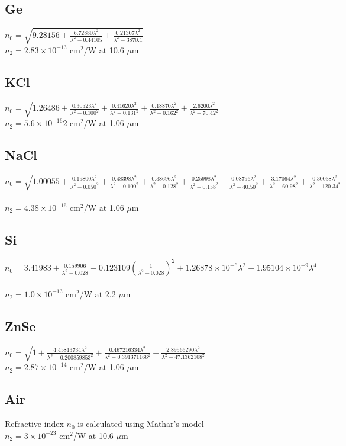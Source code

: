 \documentclass{report}
\begin{document}
\begin{appendices}
\subsection*{Ge}
$n_0=\sqrt{9.28156+\frac{6.72880\lambda^2}{\lambda^2-0.44105}+\frac{0.21307\lambda^2}{\lambda^2-3870.1}}$ \cite{Barnes-1979}\\
$n_2 = 2.83\times 10^{-13}$ cm$^2$/W at 10.6 $\mu$m \cite{Sheik-Bahae-1991}
\subsection*{KCl}
$n_0=\sqrt{1.26486+\frac{0.30523\lambda^2}{\lambda^2-0.100^2}+\frac{0.41620\lambda^2}{\lambda^2-0.131^2}+\frac{0.18870\lambda^2}{\lambda^2-0.162^2}+\frac{2.6200\lambda^2}{\lambda^2-70.42^2}}$ \cite{Li-1976}\\
$n_2 = 5.6 \times 10^{-16}2$ cm$^2$/W at 1.06 $\mu$m \cite{Sheik-Bahae-1991}
\subsection*{NaCl}
$n_0=\sqrt{1.00055+\frac{0.19800\lambda^2}{\lambda^2-0.050^2}+\frac{0.48398\lambda^2}{\lambda^2-0.100^2}+\frac{0.38696\lambda^2}{\lambda^2-0.128^2}+\frac{0.25998\lambda^2}{\lambda^2-0.158^2}+\frac{0.08796\lambda^2}{\lambda^2-40.50^2}+\frac{3.17064\lambda^2}{\lambda^2-60.98^2}+\frac{0.30038\lambda^2}{\lambda^2-120.34^2}}$ \cite{Li-1976}\\
$n_2 = 4.38\times 10^{-16}$ cm$^2$/W at 1.06 $\mu$m \cite{Sheik-Bahae-1991}
\subsection*{Si}
$n_0=3.41983+\frac{0.159906}{\lambda^2-0.028}-0.123109\left(\frac{1}{\lambda^2-0.028}\right)^2+1.26878\times 10^{-6}\lambda^2-1.95104\times 10^{-9}\lambda^4$ \cite{Edwards-1980}\\
$n_2 = 1.0\times 10^{-13}$ cm$^2$/W at 2.2 $\mu$m \cite{Bristow-2007}
\subsection*{ZnSe}
$n_0=\sqrt{1+\frac{4.45813734\lambda^2}{\lambda^2-0.200859853^2}+\frac{0.467216334\lambda^2}{\lambda^2-0.391371166^2}+\frac{2.89566290\lambda^2}{\lambda^2-47.1362108^2}}$ \cite{Tatian-1984}\\
$n_2 = 2.87\times 10^{-14}$ cm$^2$/W at 1.06 $\mu$m \cite{Sheik-Bahae-1991}
\subsection*{Air}
Refractive index $n_0$ is calculated using Mathar's model \cite{Mathar-2007}\\
$n_2 = 3\times 10^{-23}$ cm$^2$/W at 10.6 $\mu$m \cite{Geints-2014}



\end{appendices}
\end{document}
